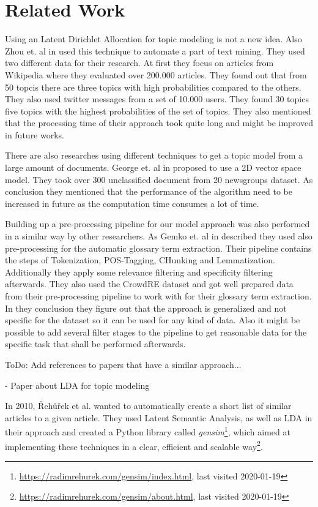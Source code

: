 \section{Related Work} %
\label{sec:related_work}

Using an Latent Dirichlet Allocation for topic modeling is not a new idea. Also Zhou et. al in \cite{zhou_tong_text_2016} used this technique to automate a part of text mining. They used two different data for their research. At first they focus on articles from Wikipedia where they evaluated over 200.000 articles. They found out that from 50 topcis there are three topics with high probabilities compared to the others. They also used twitter messages from a set of 10.000 users. They found 30 topics five topics with the highest probabilities of the set of topics. They also mentioned that the processing time of their approach took quite long and might be improved in future works.


There are also researches using different techniques to get a topic model from a large amount of documents. George et. al in \cite{george_unsupervised_2018} proposed to use a 2D vector space model. They took over 300 unclassified document from 20 newsgroups dataset. As conclusion they mentioned that the performance of the algorithm need to be increased in future as the computation time consumes a lot of time.


Building up a pre-processing pipeline for our model approach was also performed in a similar way by other researchers. As Gemko et. al in \cite{gemkow_automatic_2018} described they used also pre-processing for the automatic glossary term extraction. Their pipeline contains the steps of Tokenization, POS-Tagging, CHunking and Lemmatization. Additionally they apply some relevance filtering and specificity filtering afterwards. They also used the CrowdRE dataset and got well prepared data from their pre-processing pipeline to work with for their glossary term extraction. In they conclusion they figure out that the approach is generalized and not specific for the dataset so it can be used for any kind of data. Also it might be possible to add several filter stages to the pipeline to get reasonable data for the specific task that shall be performed afterwards.

\colorbox{yellow!30}{ToDo:} Add references to papers that have a similar approach...

- Paper about LDA for topic modeling

In 2010, {\v R}eh{\r u}{\v r}ek et al. wanted to automatically create a short list of similar articles to a given article\cite{rehurek_software_2010}. They used Latent Semantic Analysis, as well as LDA in their approach and created a Python library called \emph{gensim}\footnote{\url{https://radimrehurek.com/gensim/index.html}, last visited 2020-01-19\label{fn:gensim_website}}, which aimed at implementing these techniques in a clear, efficient and scalable way\footnote{\url{https://radimrehurek.com/gensim/about.html}, last visited 2020-01-19}.